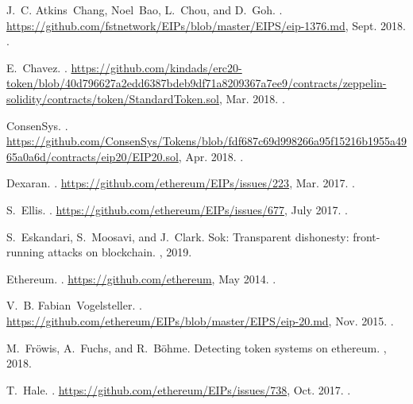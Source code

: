 \begin{thebibliography}{10}
\footnotesize
{}
J.~C. Atkins~Chang, Noel~Bao, L.~Chou, and D.~Goh.
.
\newblock
  \url{https://github.com/fstnetwork/EIPs/blob/master/EIPS/eip-1376.md}, Sept.
  2018.
.

E.~Chavez.
.
\newblock
  \url{https://github.com/kindads/erc20-token/blob/40d796627a2edd6387bdeb9df71a8209367a7ee9/contracts/zeppelin-solidity/contracts/token/StandardToken.sol},
  Mar. 2018.
.

ConsenSys.
.
\newblock
  \url{https://github.com/ConsenSys/Tokens/blob/fdf687c69d998266a95f15216b1955a4965a0a6d/contracts/eip20/EIP20.sol},
  Apr. 2018.
.

Dexaran.
.
\newblock \url{https://github.com/ethereum/EIPs/issues/223}, Mar. 2017.
.

S.~Ellis.
.
\newblock \url{https://github.com/ethereum/EIPs/issues/677}, July 2017.
.

S.~Eskandari, S.~Moosavi, and J.~Clark.
\newblock Sok: Transparent dishonesty: front-running attacks on blockchain.
, 2019.

Ethereum.
.
\newblock \url{https://github.com/ethereum}, May 2014.
.

V.~B. Fabian~Vogelsteller.
.
\newblock \url{https://github.com/ethereum/EIPs/blob/master/EIPS/eip-20.md},
  Nov. 2015.
.

M.~Fr{\"o}wis, A.~Fuchs, and R.~B{\"o}hme.
\newblock Detecting token systems on ethereum.
, 2018.

T.~Hale.
.
\newblock \url{https://github.com/ethereum/EIPs/issues/738}, Oct. 2017.
.


\end{thebibliography}

